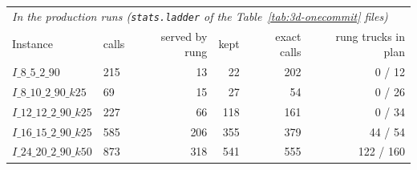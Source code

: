 \begin{table}[!htbp]
\begin{tabular}{llrrrr}
\midrule
\multicolumn{6}{l}{\emph{In the production runs (\texttt{stats.ladder} of the Table~\ref{tab:3d-onecommit} files)}} \\
Instance & calls & served by rung & kept & exact calls & rung trucks in plan \\
\midrule
$I\_8\_5\_2\_90$ & 215 & 13 & 22 & 202 & 0 / 12 \\
$I\_8\_10\_2\_90\_k25$ & 69 & 15 & 27 & 54 & 0 / 26 \\
$I\_12\_12\_2\_90\_k25$ & 227 & 66 & 118 & 161 & 0 / 34 \\
$I\_16\_15\_2\_90\_k25$ & 585 & 206 & 355 & 379 & 44 / 54 \\
$I\_24\_20\_2\_90\_k50$ & 873 & 318 & 541 & 555 & 122 / 160 \\
\bottomrule
\end{tabular}
\end{table}

